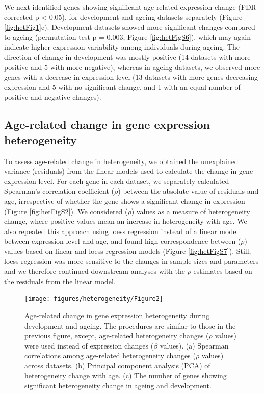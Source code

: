 \documentclass[12pt,twoside]{unicam}
\begin{document}
We next identified genes showing significant age-related expression change (FDR-corrected p \textless{} 0.05), for development and ageing datasets separately (Figure \ref{fig:hetFig1}c). Development datasets showed more significant changes compared to ageing (permutation test p = 0.003, Figure \ref{fig:hetFigS6}), which may again indicate higher expression variability among individuals during ageing. The direction of change in development was mostly positive (14 datasets with more positive and 5 with more negative), whereas in ageing datasets, we observed more genes with a decrease in expression level (13 datasets with more genes decreasing expression and 5 with no significant change, and 1 with an equal number of positive and negative changes).

\hypertarget{age-related-change-in-gene-expression-heterogeneity}{%
\subsection{Age-related change in gene expression heterogeneity}\label{age-related-change-in-gene-expression-heterogeneity}}

To assess age-related change in heterogeneity, we obtained the unexplained variance (residuals) from the linear models used to calculate the change in gene expression level. For each gene in each dataset, we separately calculated Spearman's correlation coefficient (\(\rho\)) between the absolute value of residuals and age, irrespective of whether the gene shows a significant change in expression (Figure \ref{fig:hetFigS2}). We considered (\(\rho\)) values as a measure of heterogeneity change, where positive values mean an increase in heterogeneity with age. We also repeated this approach using loess regression instead of a linear model between expression level and age, and found high correspondence between (\(\rho\)) values based on linear and loess regression models (Figure \ref{fig:hetFigS7}). Still, loess regression was more sensitive to the changes in sample sizes and parameters and we therefore continued downstream analyses with the \(\rho\) estimates based on the residuals from the linear model.

\begin{figure}

{\centering \texttt{[image: figures/heterogeneity/Figure2]} 

}

\caption[Age-related change in gene expression heterogeneity during postnatal development and ageing]{Age-related change in gene expression heterogeneity during development and ageing. The procedures are similar to those in the previous figure, except, age-related heterogeneity changes ($\rho$ values) were used instead of expression changes ($\beta$ values). (a) Spearman correlations among age-related heterogeneity changes ($\rho$  values) across datasets. (b) Principal component analysis (PCA) of heterogeneity change with age. (c) The number of genes showing significant heterogeneity change in ageing and development.}\label{fig:hetFig2}
\end{figure}
\end{document}
